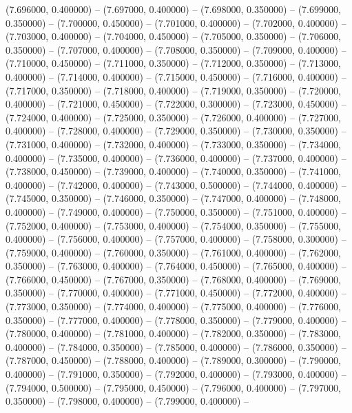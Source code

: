 (7.696000, 0.400000) -- 
(7.697000, 0.400000) -- 
(7.698000, 0.350000) -- 
(7.699000, 0.350000) -- 
(7.700000, 0.450000) -- 
(7.701000, 0.400000) -- 
(7.702000, 0.400000) -- 
(7.703000, 0.400000) -- 
(7.704000, 0.450000) -- 
(7.705000, 0.350000) -- 
(7.706000, 0.350000) -- 
(7.707000, 0.400000) -- 
(7.708000, 0.350000) -- 
(7.709000, 0.400000) -- 
(7.710000, 0.450000) -- 
(7.711000, 0.350000) -- 
(7.712000, 0.350000) -- 
(7.713000, 0.400000) -- 
(7.714000, 0.400000) -- 
(7.715000, 0.450000) -- 
(7.716000, 0.400000) -- 
(7.717000, 0.350000) -- 
(7.718000, 0.400000) -- 
(7.719000, 0.350000) -- 
(7.720000, 0.400000) -- 
(7.721000, 0.450000) -- 
(7.722000, 0.300000) -- 
(7.723000, 0.450000) -- 
(7.724000, 0.400000) -- 
(7.725000, 0.350000) -- 
(7.726000, 0.400000) -- 
(7.727000, 0.400000) -- 
(7.728000, 0.400000) -- 
(7.729000, 0.350000) -- 
(7.730000, 0.350000) -- 
(7.731000, 0.400000) -- 
(7.732000, 0.400000) -- 
(7.733000, 0.350000) -- 
(7.734000, 0.400000) -- 
(7.735000, 0.400000) -- 
(7.736000, 0.400000) -- 
(7.737000, 0.400000) -- 
(7.738000, 0.450000) -- 
(7.739000, 0.400000) -- 
(7.740000, 0.350000) -- 
(7.741000, 0.400000) -- 
(7.742000, 0.400000) -- 
(7.743000, 0.500000) -- 
(7.744000, 0.400000) -- 
(7.745000, 0.350000) -- 
(7.746000, 0.350000) -- 
(7.747000, 0.400000) -- 
(7.748000, 0.400000) -- 
(7.749000, 0.400000) -- 
(7.750000, 0.350000) -- 
(7.751000, 0.400000) -- 
(7.752000, 0.400000) -- 
(7.753000, 0.400000) -- 
(7.754000, 0.350000) -- 
(7.755000, 0.400000) -- 
(7.756000, 0.400000) -- 
(7.757000, 0.400000) -- 
(7.758000, 0.300000) -- 
(7.759000, 0.400000) -- 
(7.760000, 0.350000) -- 
(7.761000, 0.400000) -- 
(7.762000, 0.350000) -- 
(7.763000, 0.400000) -- 
(7.764000, 0.450000) -- 
(7.765000, 0.400000) -- 
(7.766000, 0.450000) -- 
(7.767000, 0.350000) -- 
(7.768000, 0.400000) -- 
(7.769000, 0.350000) -- 
(7.770000, 0.400000) -- 
(7.771000, 0.450000) -- 
(7.772000, 0.400000) -- 
(7.773000, 0.350000) -- 
(7.774000, 0.400000) -- 
(7.775000, 0.400000) -- 
(7.776000, 0.350000) -- 
(7.777000, 0.400000) -- 
(7.778000, 0.350000) -- 
(7.779000, 0.400000) -- 
(7.780000, 0.400000) -- 
(7.781000, 0.400000) -- 
(7.782000, 0.350000) -- 
(7.783000, 0.400000) -- 
(7.784000, 0.350000) -- 
(7.785000, 0.400000) -- 
(7.786000, 0.350000) -- 
(7.787000, 0.450000) -- 
(7.788000, 0.400000) -- 
(7.789000, 0.300000) -- 
(7.790000, 0.400000) -- 
(7.791000, 0.350000) -- 
(7.792000, 0.400000) -- 
(7.793000, 0.400000) -- 
(7.794000, 0.500000) -- 
(7.795000, 0.450000) -- 
(7.796000, 0.400000) -- 
(7.797000, 0.350000) -- 
(7.798000, 0.400000) -- 
(7.799000, 0.400000) -- 
